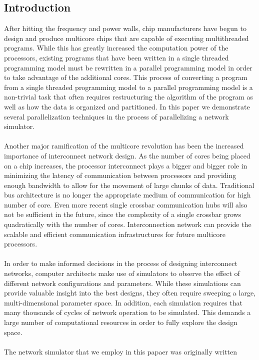 \documentclass{article}
\begin{document}
\begin{multicols}{2}
\section{Introduction}
After hitting the frequency and power walls, chip manufacturers have begun
to design and produce multicore chips that are capable of executing
multithreaded programs.  While this has greatly increased the computation power of the processors, existing programs that have been
written in a single threaded programming model must be rewritten in a
parallel programming model in order to take advantage of the additional cores.  This process of converting a program from a single threaded
programming model to a parallel programming model is a non-trivial task
that often requires restructuring the algorithm of the program as well as
how the data is organized and partitioned.  In this paper we demonstrate
several parallelization techniques in the process of parallelizing a
network simulator.\\
~\\
Another major ramification of the multicore revolution has been the
increased importance of interconnect network design.  As the number of
cores being placed on a chip increases, the processor interconnect plays a bigger and
bigger role in minimizing the latency of communication between processors
and providing enough bandwidth to allow for the movement of large chunks
of data. Traditional bus architecture is no longer the appropriate medium of communication for high number of core. Even more recent single crossbar communication hubs will also not be sufficient in the future, since the complexity of a single crossbar grows quadratically with the number of cores. Interconnection network can provide the scalable and efficient communication
infrastructures for future multicore processors. \\
~\\
In order to make informed decisions in the process of designing
interconnect networks, computer architects make use of simulators to
observe the effect of different network configurations and parameters.  While
these simulations can provide valuable insight into the best designs, they
often require sweeping a large, multi-dimensional parameter space.  In
addition, each simulation requires that many thousands of cycles
of network operation to be simulated.  This demands a large number of computational
resources in order to fully explore the design space.\\
~\\
The network simulator that we employ in this papaer was originally written

\end{multicols}
\end{document}
